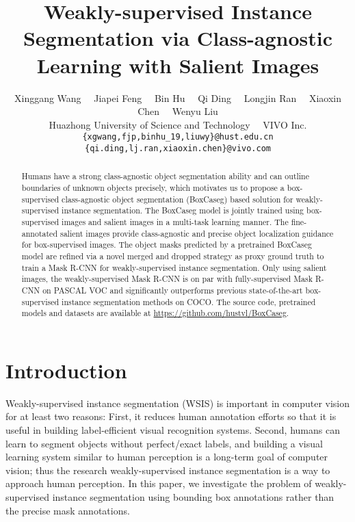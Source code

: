\documentclass[final]{cvpr}
\title{Weakly-supervised Instance Segmentation via Class-agnostic Learning with Salient Images}
\begin{document}
\author{Xinggang Wang \ \  Jiapei Feng \ \  Bin Hu \ \   Qi Ding \ \ Longjin Ran \ \ Xiaoxin Chen \ \  Wenyu Liu  \\
        Huazhong University of Science and Technology \ \   VIVO Inc. \\    
        {\tt\small \{xgwang,fjp,binhu\_19,liuwy\}@hust.edu.cn \{qi.ding,lj.ran,xiaoxin.chen\}@vivo.com}
}


\maketitle


\begin{abstract}
    Humans have a strong class-agnostic object segmentation ability and can outline boundaries of unknown objects precisely, which motivates us to propose a box-supervised class-agnostic object segmentation (BoxCaseg) based solution for weakly-supervised instance segmentation. The BoxCaseg model is jointly trained using box-supervised images and salient images in a multi-task learning manner. The fine-annotated salient images provide class-agnostic and precise object localization guidance for box-supervised images. The object masks predicted by a pretrained BoxCaseg model are refined via a novel merged and dropped strategy as proxy ground truth to train a Mask R-CNN for weakly-supervised instance segmentation. Only using  salient images, the weakly-supervised Mask R-CNN is on par with fully-supervised Mask R-CNN on PASCAL VOC and significantly outperforms previous state-of-the-art box-supervised instance segmentation methods on COCO. The source code, pretrained models and datasets are available at \url{https://github.com/hustvl/BoxCaseg}.
\end{abstract}

\let\thefootnote\relax{}


\vspace{-3mm}
\section{Introduction}
Weakly-supervised instance segmentation (WSIS) is important in computer vision for at least two reasons: First, it reduces human annotation efforts so that it is useful in building label-efficient visual recognition systems. Second, humans can learn to segment objects without perfect/exact labels, and building a visual learning system similar to human perception is a long-term goal of computer vision; thus the research weakly-supervised instance segmentation is a way to approach human perception. In this paper, we investigate the problem of weakly-supervised instance segmentation using bounding box annotations rather than the precise mask annotations. 
\end{document}
